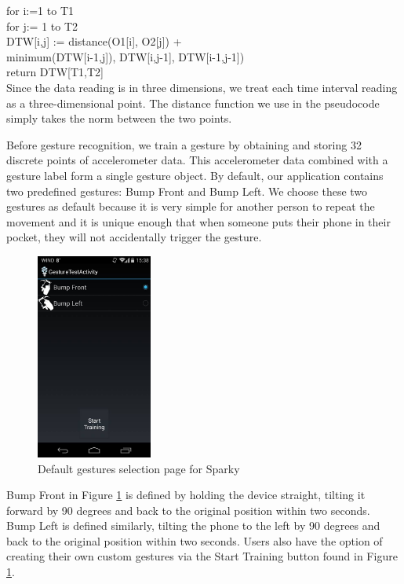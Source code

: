 \documentclass[journal]{IEEEtran}
\begin{document}
 	\noindent 
 	\hspace*{0.25cm}for i:=1 to T1\\
 	\hspace*{0.5cm}for j:= 1 to T2\\
 	\hspace*{0.75cm}DTW[i,j] := distance(O1[i], O2[j]) +\\
 	\hspace*{1cm}minimum(DTW[i-1,j]), DTW[i,j-1], DTW[i-1,j-1])\\
 	
 	\noindent 
 	\hspace*{0.25cm}return DTW[T1,T2]\\
 	
\noindent 
Since the data reading is in three dimensions, we treat each time interval reading as a three-dimensional point. The distance function we use in the pseudocode simply takes the norm between the two points. 

Before gesture recognition, we train a gesture by obtaining and storing 32 discrete points of accelerometer data. This accelerometer data combined with a gesture label form a single gesture object. By default, our application contains two predefined gestures: Bump Front and Bump Left. We choose these two gestures as default because it is very simple for another person to repeat the movement and it is unique enough that when someone puts their phone in their pocket, they will not accidentally trigger the gesture.

\begin{figure}[!t]
\centering
\includegraphics[width=1.5in]{S1.jpg}
\caption{Default gestures selection page for Sparky}
\label{gestureSelectScreenshot}
\end{figure}


Bump Front in Figure \ref{gestureSelectScreenshot} is defined by holding the device straight, tilting it forward by 90 degrees and back to the original position within two seconds. Bump Left is defined similarly, tilting the phone to the left by 90 degrees and back to the original position within two seconds. Users also have the option of creating their own custom gestures via the Start Training button found in Figure \ref{gestureSelectScreenshot}.
\end{document}
